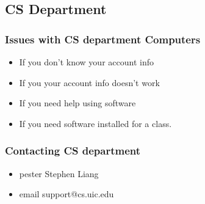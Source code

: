 \documentclass[hyperref={pdfpagelabels=false}]{beamer}
\begin{document}
\subsection{CS Department}
\frame
{
    \frametitle{Issues with CS department Computers}
    \begin{itemize}
    \item{If you don't know your account info}
    \item{If you your account info doesn't work}
    \item{If you need help using software}
    \item{If you need software installed for a class.}
    \end{itemize}
}
\frame
{
    \frametitle{Contacting CS department}
    \begin{itemize}
    \item{pester Stephen Liang}
    \item{email support@cs.uic.edu}
    \end{itemize}
}
\end{document}
